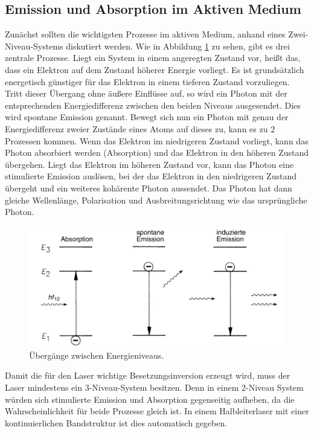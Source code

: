 \subsection{Emission und Absorption im Aktiven Medium}
Zunächst sollten die wichtigsten Prozesse im aktiven Medium, anhand eines Zwei-Niveau-Systems diskutiert werden. 
Wie in Abbildung \ref{fig:Prozesse} zu sehen, gibt es drei zentrale Prozesse. Liegt ein System in einem angeregten Zustand vor, heißt das, dass ein Elektron auf dem Zustand höherer Energie vorliegt.
Es ist grundsätzlich energetisch günstiger für das Elektron in einem tieferen Zustand vorzuliegen. Tritt dieser Übergang ohne äußere Einflüsse auf, so wird ein Photon mit der entsprechenden Energiedifferenz zwischen den beiden Niveaus ausgesendet. Dies wird spontane Emission genannt.
Bewegt sich nun ein Photon mit genau der Energiedifferenz zweier Zustände eines Atoms auf dieses zu, kann es zu 2 Prozessen kommen.
Wenn das Elektron im niedrigeren Zustand vorliegt, kann das Photon absorbiert werden (Absorption) und 
das Elektron in den höheren Zustand übergehen. Liegt das Elektron im höheren Zustand vor, kann das Photon eine stimulierte Emission auslösen, bei der 
das Elektron in den niedrigeren Zustand übergeht und ein weiteres kohärente Photon aussendet. Das Photon hat dann gleiche Wellenlänge, Polarisation und Ausbreitungsrichtung wie das ursprüngliche Photon.
\begin{figure}[H]
    \centering
    \includegraphics[scale=0.9]{pictures/Prozesse.png}
    \caption{Übergänge zwischen Energieniveaus\cite{Eichler20152}.}
    \label{fig:Prozesse}
\end{figure}
Damit die für den Laser wichtige Besetzungsinversion erzeugt wird, muss der Laser mindestens ein 3-Niveau-System besitzen.
Denn in einem 2-Niveau System würden sich stimulierte Emission und Absorption gegenseitig aufheben, da die Wahrscheinlichkeit für beide Prozesse gleich ist.
In einem Halbleiterlaser mit einer kontinuierlichen Bandstruktur ist dies automatisch gegeben.
